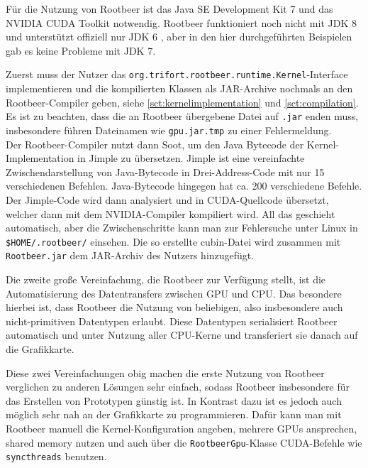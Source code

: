 
Für die Nutzung von Rootbeer ist das Java SE Development Kit 7 und das NVIDIA CUDA Toolkit notwendig.
Rootbeer funktioniert noch nicht mit JDK 8 und unterstützt offiziell nur JDK 6 \cite{rootbeerjdk6}, aber in den hier durchgeführten Beispielen gab es keine Probleme mit JDK 7.

Zuerst muss der Nutzer das \lstinline!org.trifort.rootbeer.runtime.Kernel!-Interface implementieren und die kompilierten Klassen als JAR-Archive nochmals an den Rootbeer-Compiler geben, siehe \autoref{sct:kernelimplementation} und \autoref{sct:compilation}.
Es ist zu beachten, dass die an Rootbeer übergebene Datei auf \texttt{.jar} enden muss, insbesondere führen Dateinamen wie \texttt{gpu.jar.tmp} zu einer Fehlermeldung.\\

Der Rootbeer-Compiler nutzt dann Soot\cite{sootsite,sootretrospective}, um den Java Bytecode der Kernel-Implementation in Jimple zu übersetzen.
Jimple ist eine vereinfachte Zwischendarstellung von Java-Bytecode in Drei-Address-Code mit nur 15 verschiedenen Befehlen. Java-Bytecode hingegen hat ca. 200 verschiedene Befehle.
Der Jimple-Code wird dann analysiert und in CUDA-Quellcode übersetzt, welcher dann mit dem NVIDIA-Compiler kompiliert wird.
All das geschieht automatisch, aber die Zwischenschritte kann man zur Fehlersuche unter Linux in \lstinline!$HOME/.rootbeer/! einsehen.
Die so erstellte cubin-Datei wird zusammen mit \texttt{Rootbeer.jar} dem JAR-Archiv des Nutzers hinzugefügt.

Die zweite große Vereinfachung, die Rootbeer zur Verfügung stellt, ist die Automatisierung des Datentransfers zwischen GPU und CPU.
Das besondere hierbei ist, dass Rootbeer die Nutzung von beliebigen, also insbesondere auch nicht-primitiven Datentypen erlaubt.
Diese Datentypen serialisiert Rootbeer automatisch und unter Nutzung aller CPU-Kerne und transferiert sie danach auf die Grafikkarte.

Diese zwei Vereinfachungen obig machen die erste Nutzung von Rootbeer verglichen zu anderen Lösungen sehr einfach, sodass Rootbeer insbesondere für das Erstellen von Prototypen günstig ist.
In Kontrast dazu ist es jedoch auch möglich sehr nah an der Grafikkarte zu programmieren.
Dafür kann man mit Rootbeer manuell die Kernel-Konfiguration angeben, mehrere GPUs ansprechen, shared memory nutzen und auch über die \lstinline!RootbeerGpu!-Klasse CUDA-Befehle wie \lstinline!syncthreads! benutzen.
